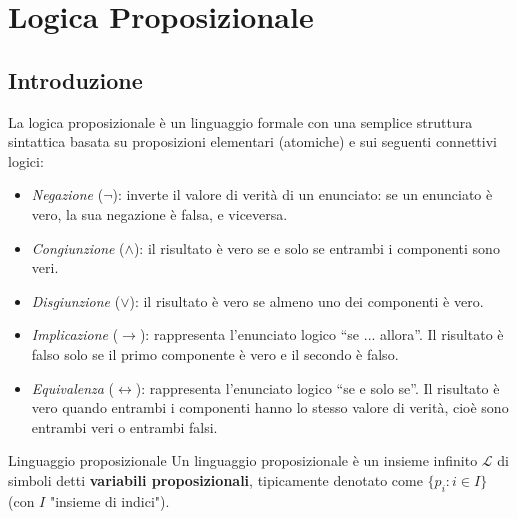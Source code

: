 \documentclass[a4paper,12pt]{report}
\begin{document}
\makefrontpage

\tableofcontents

\chapter{Logica Proposizionale}

\section{Introduzione}

La logica proposizionale è un linguaggio formale con una semplice struttura sintattica basata su proposizioni elementari (atomiche) e sui seguenti connettivi logici:


\begin{itemize}
    \item \textit{Negazione} ($\neg$): inverte il valore di verità di un enunciato: se un enunciato è vero, la sua negazione è falsa, e viceversa.
    
    \item \textit{Congiunzione} ($\land$): il risultato è vero se e solo se entrambi i componenti sono veri.
    
    \item \textit{Disgiunzione} ($\lor$): il risultato è vero se almeno uno dei componenti è vero.
    
    \item \textit{Implicazione} ($\to$): rappresenta l’enunciato logico “se ... allora”. Il risultato è falso solo se il primo componente è vero e il secondo è falso. 
    
    \item \textit{Equivalenza} ($\leftrightarrow$): rappresenta l’enunciato logico “se e solo se”. 
    Il risultato è vero quando entrambi i componenti hanno lo stesso valore di verità, cioè sono entrambi veri o entrambi falsi.
\end{itemize}

\begin{defbox}{Linguaggio proposizionale}{}
    Un linguaggio proposizionale è un insieme infinito \( \mathcal{L} \) di simboli detti \textbf{variabili proposizionali}, tipicamente denotato come \( \{p_i : i \in I\} \) {\color{gray} (con \( I \) "insieme di indici")}.
\end{defbox}
\end{document}
